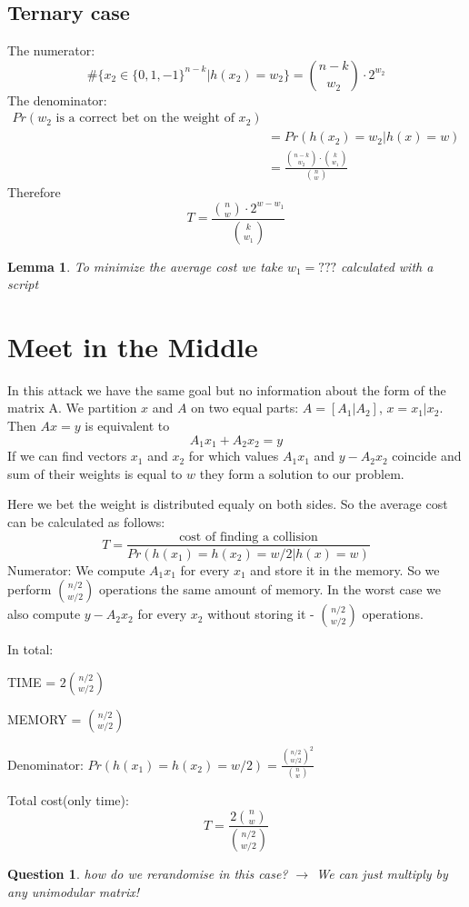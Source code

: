 \documentclass[12pt]{article}
\newtheorem{question}{Question}
\newtheorem{lemma}{Lemma}
\begin{document}
\subsection{Ternary case}
The numerator:
\[
\#\{x_2 \in \{0,1,-1\}^{n-k} | h(x_2) = w_2\} = \binom{n-k}{w_2}\cdot 2^{w_2}
\]
The denominator:
\[
\begin{split}
    Pr(w_2\text{ is a correct bet on the weight of }x_2) & \\
    & = Pr(h(x_2) = w_2|h(x) = w) \\
    & = \frac{\binom{n-k}{w_2} \cdot \binom{k}{w_1}}{\binom{n}{w}}
\end{split}
\]
Therefore
\[
T = \frac{\binom{n}{w} \cdot 2^{w - w_1}}{\binom{k}{w_1}}
\]
\begin{lemma}
To minimize the average cost we take $w_1 = ???$ calculated with a script
\end{lemma}
\section{Meet in the Middle}
In this attack we have the same goal but no information about the form of the matrix A.
We partition $x$ and $A$ on two equal parts: $A = [A_1 | A_2]$, $x = x_1 | x_2$.
Then $Ax = y$ is equivalent to
\[
    A_1x_1 + A_2x_2 = y
\]
If we can find vectors $x_1$ and $x_2$ for which values $A_1x_1$ and $y - A_2x_2$ coincide
and sum of their weights is equal to $w$ they form a solution to our problem.

Here we bet the weight is distributed equaly on both sides. So the average cost can be calculated as follows:
\[
  T = \frac{\text{cost of finding a collision}}{Pr(h(x_1) = h(x_2) = w/2| h(x) =w)}
\]
Numerator:
We compute $A_1x_1$ for every $x_1$ and store it in the memory. So we perform $\binom{n/2}{w/2}$ operations the same amount of memory. In the worst case we also compute $y - A_2x_2$ for every $x_2$ without storing it - $\binom{n/2}{w/2}$ operations.

In total:

TIME = $2\binom{n/2}{w/2}$

MEMORY = $\binom{n/2}{w/2}$

Denominator:
$Pr(h(x_1) = h(x_2) = w/2) = \frac{\binom{n/2}{w/2}^{2}}{\binom{n}{w}}$

Total cost(only time):
\[
  T = \frac{2\binom{n}{w}}{\binom{n/2}{w/2}}
\]

\begin{question}
  how do we rerandomise in this case? $\rightarrow$ We can just multiply by any unimodular matrix!
\end{question}
\end{document}
